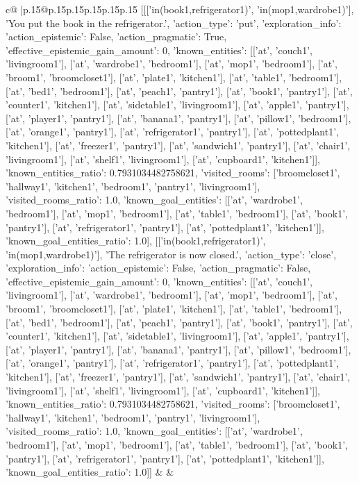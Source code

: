 \documentclass{article}
\begin{document}
{\begin{supertabular}{c@{$\;$}|p{.15\linewidth}@{}p{.15\linewidth}p{.15\linewidth}p{.15\linewidth}p{.15\linewidth}p{.15\linewidth}}
{{{	 [[['in(book1,refrigerator1)', 'in(mop1,wardrobe1)'], 'You put the book in the refrigerator.', {'action_type': 'put', 'exploration_info': {'action_epistemic': False, 'action_pragmatic': True, 'effective_epistemic_gain_amount': 0, 'known_entities': [['at', 'couch1', 'livingroom1'], ['at', 'wardrobe1', 'bedroom1'], ['at', 'mop1', 'bedroom1'], ['at', 'broom1', 'broomcloset1'], ['at', 'plate1', 'kitchen1'], ['at', 'table1', 'bedroom1'], ['at', 'bed1', 'bedroom1'], ['at', 'peach1', 'pantry1'], ['at', 'book1', 'pantry1'], ['at', 'counter1', 'kitchen1'], ['at', 'sidetable1', 'livingroom1'], ['at', 'apple1', 'pantry1'], ['at', 'player1', 'pantry1'], ['at', 'banana1', 'pantry1'], ['at', 'pillow1', 'bedroom1'], ['at', 'orange1', 'pantry1'], ['at', 'refrigerator1', 'pantry1'], ['at', 'pottedplant1', 'kitchen1'], ['at', 'freezer1', 'pantry1'], ['at', 'sandwich1', 'pantry1'], ['at', 'chair1', 'livingroom1'], ['at', 'shelf1', 'livingroom1'], ['at', 'cupboard1', 'kitchen1']], 'known_entities_ratio': 0.7931034482758621, 'visited_rooms': ['broomcloset1', 'hallway1', 'kitchen1', 'bedroom1', 'pantry1', 'livingroom1'], 'visited_rooms_ratio': 1.0, 'known_goal_entities': [['at', 'wardrobe1', 'bedroom1'], ['at', 'mop1', 'bedroom1'], ['at', 'table1', 'bedroom1'], ['at', 'book1', 'pantry1'], ['at', 'refrigerator1', 'pantry1'], ['at', 'pottedplant1', 'kitchen1']], 'known_goal_entities_ratio': 1.0}}], [['in(book1,refrigerator1)', 'in(mop1,wardrobe1)'], 'The refrigerator is now closed.', {'action_type': 'close', 'exploration_info': {'action_epistemic': False, 'action_pragmatic': False, 'effective_epistemic_gain_amount': 0, 'known_entities': [['at', 'couch1', 'livingroom1'], ['at', 'wardrobe1', 'bedroom1'], ['at', 'mop1', 'bedroom1'], ['at', 'broom1', 'broomcloset1'], ['at', 'plate1', 'kitchen1'], ['at', 'table1', 'bedroom1'], ['at', 'bed1', 'bedroom1'], ['at', 'peach1', 'pantry1'], ['at', 'book1', 'pantry1'], ['at', 'counter1', 'kitchen1'], ['at', 'sidetable1', 'livingroom1'], ['at', 'apple1', 'pantry1'], ['at', 'player1', 'pantry1'], ['at', 'banana1', 'pantry1'], ['at', 'pillow1', 'bedroom1'], ['at', 'orange1', 'pantry1'], ['at', 'refrigerator1', 'pantry1'], ['at', 'pottedplant1', 'kitchen1'], ['at', 'freezer1', 'pantry1'], ['at', 'sandwich1', 'pantry1'], ['at', 'chair1', 'livingroom1'], ['at', 'shelf1', 'livingroom1'], ['at', 'cupboard1', 'kitchen1']], 'known_entities_ratio': 0.7931034482758621, 'visited_rooms': ['broomcloset1', 'hallway1', 'kitchen1', 'bedroom1', 'pantry1', 'livingroom1'], 'visited_rooms_ratio': 1.0, 'known_goal_entities': [['at', 'wardrobe1', 'bedroom1'], ['at', 'mop1', 'bedroom1'], ['at', 'table1', 'bedroom1'], ['at', 'book1', 'pantry1'], ['at', 'refrigerator1', 'pantry1'], ['at', 'pottedplant1', 'kitchen1']], 'known_goal_entities_ratio': 1.0}}]] 
	  } 
	   } 
	   } 
	 & & \\ 
 


\end{supertabular}}
\end{document}
